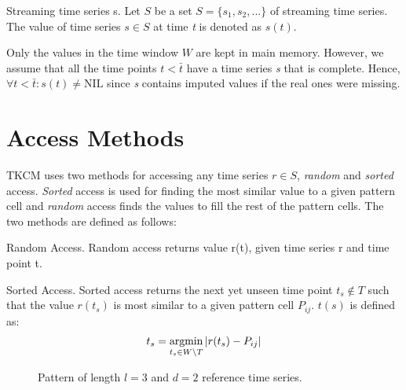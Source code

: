 \documentclass[abstracton,12pt]{scrreprt}
\begin{document}
\begin{defn}
Streaming time series s. Let $S$ be a set $S = \{s_1,s_2,...\}$ of streaming time series. The value of time series $s \in S$ at time \emph{t} is denoted as $s(t)$.
\end{defn}
Only the values in the time window $W$ are kept in main memory. However, we assume that all the time points $t < \bar{t}$ have a time series \emph{s} that is complete. Hence, $\forall t < \bar{t} : s(t) \ne \text{NIL}$ since \emph{s} contains imputed values if the real ones were missing. 


\section{Access Methods}
\label{AccessMethods}
TKCM uses two methods for accessing any time series $r \in S$, \emph{random} and \emph{sorted} access. \emph{Sorted} access is used for finding the most similar value to a given pattern cell and \emph{random} access finds the values to fill the rest of the pattern cells. The two methods are defined as follows: 
\begin{defn}
 	Random Access. Random access returns value r(t), given time series r and time point t.	
\end{defn}
\begin{defn}
	Sorted Access. Sorted access returns the next yet unseen time point $t_s \notin T$ such that the value $r(t_s)$ is most similar to a given pattern cell $P_{ij}$. $t(s)$ is defined as:
	\begin{align*}
	t_s = \argmin_{t_s \in W \setminus T} |r(t_s) - P_{ij}|
	\end{align*}
\end{defn}

\begin{figure}[H]
\centering
{}

\caption{Pattern of length $l=3$ and $d=2$ reference time series.}
\end{figure}
\end{document}

